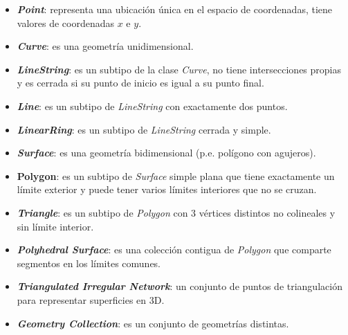 \begin{itemize}
	\item \textit{\textbf{Point}}: representa una ubicación única en el espacio de coordenadas, tiene valores de coordenadas $x$ e $y$.
	
	\item \textit{\textbf{Curve}}: es una geometría unidimensional. 
	
	\item \textit{\textbf{LineString}}: es un subtipo de la clase \textit{Curve}, no tiene intersecciones propias y es cerrada si su punto de inicio es igual a su punto final.
	
	\item \textit{\textbf{Line}}: es un subtipo de \textit{LineString} con exactamente dos puntos. 
	
	\item \textit{\textbf{LinearRing}}: es un subtipo de \textit{LineString} cerrada y simple. 
	
	\item \textit{\textbf{Surface}}: es una geometría bidimensional (p.e. polígono con agujeros).%
	
	\item \textbf{Polygon}: es un subtipo de \textit{Surface} simple plana que tiene exactamente un límite exterior y puede tener varios límites interiores que no se cruzan. %
	
	\item \textit{\textbf{Triangle}}: es un subtipo de \textit{Polygon} con 3 vértices distintos no colineales y sin límite interior. 
	
	\item \textbf{\textit{Polyhedral Surface}}: es una colección contigua de \textit{Polygon} que comparte segmentos en los límites comunes. %
	
	\item \textit{\textbf{Triangulated Irregular Network}}: un conjunto de puntos de triangulación para representar superficies en 3D.
	
	\item \textit{\textbf{Geometry Collection}}:  es un conjunto de geometrías distintas. 
		

\end{itemize}
